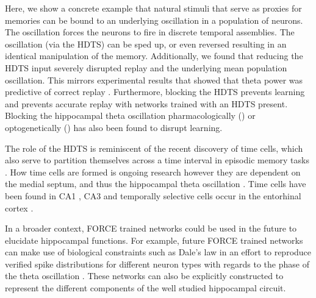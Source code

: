 \documentclass[11pt]{article} %
\begin{document}
Here, we show a concrete example that natural stimuli that serve as proxies for memories can be bound to an underlying oscillation in a population of neurons.  The oscillation forces the neurons to fire in discrete temporal assemblies.  
The oscillation (via the HDTS) can be sped up, or even reversed resulting in an identical manipulation of the memory.  Additionally, we found that reducing the HDTS input severely disrupted replay and the underlying mean population oscillation.  This mirrors experimental results that showed that theta power was predictive of correct replay \cite{thetapower1}.  Furthermore, blocking the HDTS prevents learning and prevents accurate replay with networks trained with an HDTS present.  Blocking the hippocampal theta oscillation pharmacologically (\cite{blocktheta}) or optogenetically (\cite{Adamantidis}) has also been found to disrupt learning.  

The role of the HDTS is reminiscent of the recent discovery of time cells, which also serve to partition themselves across a time interval in episodic memory tasks \cite{TC1,TC2,TC3}.   How time cells are formed is ongoing research however they are dependent on the medial septum, and thus the hippocampal theta oscillation \cite{TC7}.  Time cells have been found in CA1 \cite{TC1}, CA3 \cite{TC5} and temporally selective cells occur in the entorhinal cortex \cite{TC6}.  




In a broader context, FORCE trained networks could be used in the future to elucidate hippocampal functions.  For example, future FORCE trained networks can make use of biological constraints such as Dale's law in an effort to reproduce verified spike distributions for different neuron types with regards to the phase of the theta oscillation \cite{mizu}.  These networks can also be explicitly constructed to represent the different components of the well studied hippocampal circuit.  
\end{document}
